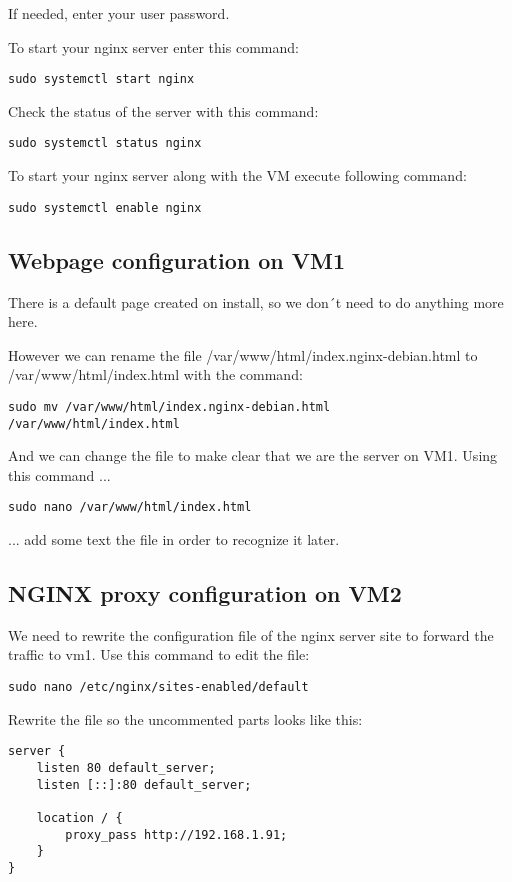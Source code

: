 \documentclass[10pt,a4paper]{article}
\begin{document}
If needed, enter your user password.

To start your nginx server enter this command:
\begin{verbatim}
sudo systemctl start nginx
\end{verbatim}

Check the status of the server with this command:
\begin{verbatim}
sudo systemctl status nginx
\end{verbatim}

To start your nginx server along with the VM execute following command:
\begin{verbatim}
sudo systemctl enable nginx
\end{verbatim}

\subsection{Webpage configuration on VM1}
There is a default page created on install, so we don´t need to do anything more here.

However we can rename the file /var/www/html/index.nginx-debian.html to /var/www/html/index.html with the command:
\begin{verbatim}
sudo mv /var/www/html/index.nginx-debian.html 
/var/www/html/index.html
\end{verbatim}

And we can change the file to make clear that we are the server on VM1. Using this command ...
\begin{verbatim}
sudo nano /var/www/html/index.html
\end{verbatim}

... add some text the file in order to recognize it later.

\subsection{NGINX proxy configuration on VM2}
We need to rewrite the configuration file of the nginx server site to forward the traffic to vm1. Use this command to edit the file:
\begin{verbatim}
sudo nano /etc/nginx/sites-enabled/default
\end{verbatim}

Rewrite the file so the uncommented parts looks like this:
\begin{verbatim}
server {
	listen 80 default_server;
	listen [::]:80 default_server;
	
	location / {
		proxy_pass http://192.168.1.91;
	}
}
\end{verbatim}
\end{document}
